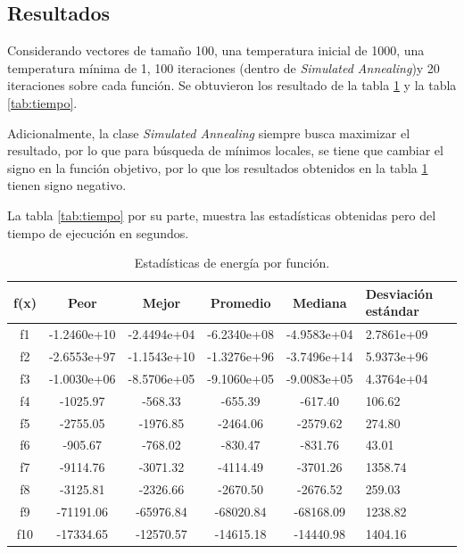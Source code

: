 \documentclass[12pt,twoside]{article}
\begin{document}
\subsection{Resultados}

Considerando vectores de tamaño 100, una temperatura inicial de 1000, una temperatura mínima de 1,  100 iteraciones (dentro de \textit{Simulated Annealing})y   20 iteraciones sobre cada función. Se obtuvieron los resultado de la tabla \ref{tab:energy} y la tabla \ref{tab:tiempo}.

Adicionalmente,  la clase \textit{Simulated Annealing} siempre busca maximizar el resultado, por lo que para búsqueda de mínimos locales, se tiene que cambiar el signo en la función objetivo, por lo que los resultados obtenidos en la tabla \ref{tab:energy} tienen signo negativo.

La tabla \ref{tab:tiempo} por su parte, muestra las estadísticas obtenidas pero del tiempo de ejecución en segundos. 

\begin{table}[h]
	\centering
	\begin{tabular}{|c|c|c|c|c|p{2.1cm}|}  
		\hline
		\textbf{f(x)} & \textbf{Peor} & \textbf{Mejor} & \textbf{Promedio} & \textbf{Mediana} & \textbf{Desviación estándar} \\  
		\hline
		f1  & -1.2460e+10 & -2.4494e+04 & -6.2340e+08 & -4.9583e+04 & 2.7861e+09 \\
		f2  & -2.6553e+97  & -1.1543e+10  & -1.3276e+96  & -3.7496e+14  & 5.9373e+96 \\
		f3  & -1.0030e+06  & -8.5706e+05  & -9.1060e+05  & -9.0083e+05  & 4.3764e+04 \\
		f4  & -1025.97     & -568.33     & -655.39     & -617.40     & 106.62 \\
		f5  & -2755.05     & -1976.85    & -2464.06    & -2579.62    & 274.80 \\
		f6  & -905.67      & -768.02     & -830.47     & -831.76     & 43.01 \\
		f7  & -9114.76     & -3071.32    & -4114.49    & -3701.26    & 1358.74 \\
		f8  & -3125.81     & -2326.66    & -2670.50    & -2676.52    & 259.03 \\
		f9  & -71191.06    & -65976.84   & -68020.84   & -68168.09   & 1238.82 \\
		f10 & -17334.65    & -12570.57   & -14615.18   & -14440.98   & 1404.16 \\
		\hline
	\end{tabular}
	\caption{Estadísticas de energía por función.}
	\label{tab:energy}
\end{table}
\end{document}
